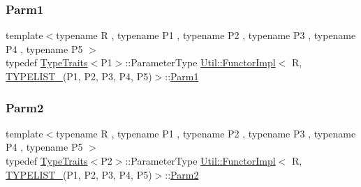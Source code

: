 \mbox{\label{classUtil_1_1FunctorImpl_3_01R_00_01TYPELIST__5_07P1_00_01P2_00_01P3_00_01P4_00_01P5_08_4_abeccc1e3199db67f0637ce1fc9b08a32}} 
\subsubsection{\texorpdfstring{Parm1}{Parm1}\hspace{0.1cm}{\footnotesize\ttfamily [3/3]}}
{\footnotesize\ttfamily template$<$typename R , typename P1 , typename P2 , typename P3 , typename P4 , typename P5 $>$ \\
typedef \mbox{\hyperlink{classUtil_1_1TypeTraits}{Type\+Traits}}$<$P1$>$\+::Parameter\+Type \mbox{\hyperlink{classUtil_1_1FunctorImpl}{Util\+::\+Functor\+Impl}}$<$ R, \mbox{\hyperlink{adat__devel__install_2include_2adat_2typelist_8h_aad5d9b3c82c8503c85c625acd41c0a2f}{T\+Y\+P\+E\+L\+I\+S\+T\+\_}}(P1, P2, P3, P4, P5)$>$\+::\mbox{\hyperlink{structUtil_1_1Private_1_1FunctorImplBase_a9d61e693d6c616dea5bd9d9073c7d21a}{Parm1}}}

\mbox{\label{classUtil_1_1FunctorImpl_3_01R_00_01TYPELIST__5_07P1_00_01P2_00_01P3_00_01P4_00_01P5_08_4_a9fbaabce4a80f1e7e9eb68fd8ad2a476}} 
\subsubsection{\texorpdfstring{Parm2}{Parm2}\hspace{0.1cm}{\footnotesize\ttfamily [1/3]}}
{\footnotesize\ttfamily template$<$typename R , typename P1 , typename P2 , typename P3 , typename P4 , typename P5 $>$ \\
typedef \mbox{\hyperlink{classUtil_1_1TypeTraits}{Type\+Traits}}$<$P2$>$\+::Parameter\+Type \mbox{\hyperlink{classUtil_1_1FunctorImpl}{Util\+::\+Functor\+Impl}}$<$ R, \mbox{\hyperlink{adat__devel__install_2include_2adat_2typelist_8h_aad5d9b3c82c8503c85c625acd41c0a2f}{T\+Y\+P\+E\+L\+I\+S\+T\+\_}}(P1, P2, P3, P4, P5)$>$\+::\mbox{\hyperlink{structUtil_1_1Private_1_1FunctorImplBase_a554085cd798ef14838a59b528f0feb2e}{Parm2}}}

